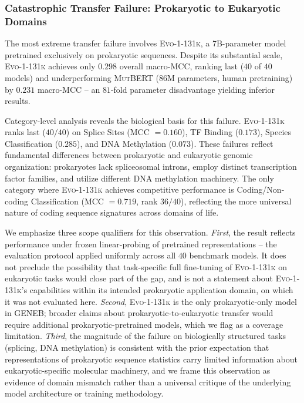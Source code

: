 \documentclass{article}
\theoremstyle{plain}
\theoremstyle{definition}
\theoremstyle{remark}
\begin{document}
\subsubsection{Catastrophic Transfer Failure: Prokaryotic to Eukaryotic Domains}

The most extreme transfer failure involves \textsc{Evo-1-131k}, a
7B-parameter model pretrained exclusively on prokaryotic
sequences. Despite its substantial scale, \textsc{Evo-1-131k}
achieves only $0.298$ overall macro-MCC, ranking last ($40$ of
$40$ models) and underperforming \textsc{MutBERT} (86M parameters,
human pretraining) by $0.231$ macro-MCC -- an $81$-fold parameter
disadvantage yielding inferior results.

Category-level analysis reveals the biological basis for this
failure. \textsc{Evo-1-131k} ranks last ($40/40$) on Splice Sites
(MCC $= 0.160$), TF Binding ($0.173$), Species Classification
($0.285$), and DNA Methylation ($0.073$). These failures reflect
fundamental differences between prokaryotic and eukaryotic genomic
organization: prokaryotes lack spliceosomal introns, employ
distinct transcription factor families, and utilize different DNA
methylation machinery. The only category where \textsc{Evo-1-131k}
achieves competitive performance is Coding/Non-coding Classification
(MCC $= 0.719$, rank $36/40$), reflecting the more universal
nature of coding sequence signatures across domains of life.

We emphasize three scope qualifiers for this observation.
\emph{First}, the result reflects performance under frozen
linear-probing of pretrained representations -- the evaluation
protocol applied uniformly across all $40$ benchmark models. It does not preclude
the possibility that task-specific full fine-tuning of
\textsc{Evo-1-131k} on eukaryotic tasks would close part of the
gap, and is not a statement about \textsc{Evo-1-131k}'s
capabilities within its intended prokaryotic application domain,
on which it was not evaluated here. \emph{Second},
\textsc{Evo-1-131k} is the only prokaryotic-only model in GENEB;
broader claims about prokaryotic-to-eukaryotic transfer would
require additional prokaryotic-pretrained models, which we flag as
a coverage limitation. \emph{Third}, the magnitude of the failure
on biologically structured tasks (splicing, DNA methylation) is
consistent with the prior expectation that representations of
prokaryotic sequence statistics carry limited information about
eukaryotic-specific molecular machinery, and we frame this
observation as evidence of domain mismatch rather than a universal
critique of the underlying model architecture or training
methodology.
\end{document}
